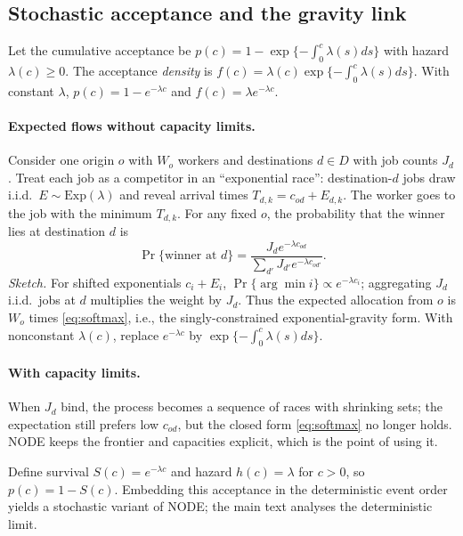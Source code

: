 \subsection{Stochastic acceptance and the gravity link}\label{si:stoch-gravity}

Let the cumulative acceptance be $p(c)=1-\exp\{-\int_0^c\lambda(s)ds\}$ with hazard $\lambda(c)\ge0$. The acceptance \emph{density} is $f(c)=\lambda(c)\exp\{-\int_0^c\lambda(s)ds\}$. With constant $\lambda$, $p(c)=1-e^{-\lambda c}$ and $f(c)=\lambda e^{-\lambda c}$.

\paragraph{Expected flows without capacity limits.} Consider one origin $o$ with $W_o$ workers and destinations $d\in D$ with job counts $J_d$. Treat each job as a competitor in an ``exponential race'': destination-$d$ jobs draw i.i.d.\ $E\sim\mathrm{Exp}(\lambda)$ and reveal arrival times $T_{d,k}=c_{od}+E_{d,k}$. The worker goes to the job with the minimum $T_{d,k}$. For any fixed $o$, the probability that the winner lies at destination $d$ is
\begin{equation}
\Pr\{\text{winner at }d\}=\frac{J_de^{-\lambda c_{od}}}{\sum_{d'} J_{d'}e^{-\lambda c_{od'}}}.\label{eq:softmax}
\end{equation}
\emph{Sketch.} For shifted exponentials $c_i+E_i$, $\Pr\{\arg\min i\}\propto e^{-\lambda c_i}$; aggregating $J_d$ i.i.d.\ jobs at $d$ multiplies the weight by $J_d$. Thus the expected allocation from $o$ is $W_o$ times \eqref{eq:softmax}, i.e., the singly-constrained exponential-gravity form. With nonconstant $\lambda(c)$, replace $e^{-\lambda c}$ by $\exp\{-\int_0^{c}\lambda(s)ds\}$.

\paragraph{With capacity limits.} When $J_d$ bind, the process becomes a sequence of races with shrinking sets; the expectation still prefers low $c_{od}$, but the closed form \eqref{eq:softmax} no longer holds. NODE keeps the frontier and capacities explicit, which is the point of using it.


Define survival $S(c)=e^{-\lambda c}$ and hazard $h(c)=\lambda$ for $c>0$, so $p(c)=1-S(c)$.
Embedding this acceptance in the deterministic event order yields a stochastic variant of NODE; the main text analyses the deterministic limit.





